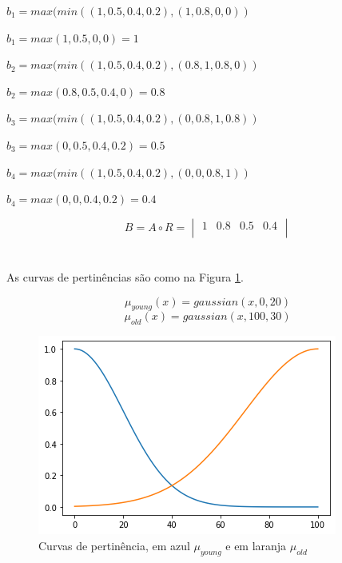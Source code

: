 \documentclass[conference]{IEEEtran}
\newcommand\w{1.0}
\begin{document}
$b_1 = max(min((1, 0.5, 0.4, 0.2), (1, 0.8, 0, 0))$

$b_1 = max(1, 0.5, 0, 0)  = 1 $

\hspace{.5cm}
 
$b_2 = max(min((1, 0.5, 0.4, 0.2), (0.8, 1, 0.8, 0))$

$b_2 = max(0.8, 0.5, 0.4, 0) = 0.8$ 

\hspace{.5cm}

$b_3 = max(min((1, 0.5, 0.4, 0.2), (0, 0.8, 1, 0.8))$

$b_3 = max(0, 0.5, 0.4, 0.2) = 0.5$

\hspace{.5cm}

$b_4 = max(min((1, 0.5, 0.4, 0.2), (0, 0, 0.8, 1))$

$b_4 = max(0, 0, 0.4, 0.2) = 0.4$

\hspace{1cm}

\[
B = A \circ R = 
\begin{vmatrix}
1 & 0.8 & 0.5 & 0.4 \\
\end{vmatrix}
\]

\hfill
\section{}  %

\par As curvas de pertinências são como na Figura \ref{fig:plot03}.

\[\mu_{young}(x) = gaussian(x, 0, 20)\]
\[\mu_{old}(x) = gaussian(x, 100, 30)\]

\begin{figure}[htbp]
\centering
\includegraphics[width=\w\linewidth]{fig/plot03.png}
\caption{Curvas de pertinência, em azul $\mu_{young}$ e em laranja $\mu_{old}$}
\label{fig:plot03}
\end{figure}
\end{document}
